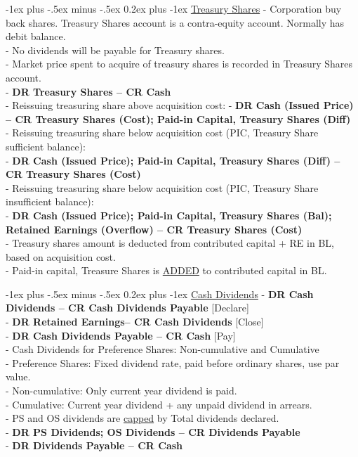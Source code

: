 \documentclass[10pt,landscape]{article}
\makeatletter
\renewcommand{\subsubsection}{\@startsection{subsubsection}{3}{0mm}%
                                {-1ex plus -.5ex minus -.5ex}%
                                {0.2ex plus -1ex}%
                                {\normalfont\footnotesize\bfseries}}
\makeatother
\begin{document}
\begin{multicols}{3}
\begin{scriptsize}
\subsubsection{\underline{Treasury Shares}}
- Corporation buy back shares. Treasury Shares account is a contra-equity account. Normally has debit balance.\\
- No dividends will be payable for Treasury shares.\\
- Market price spent to acquire of treasury shares is recorded in Treasury Shares account.\\
- \textbf{DR Treasury Shares -- CR Cash}\\
- Reissuing treasuring share above acquisition cost:
- \textbf{DR Cash (Issued Price) -- CR Treasury Shares (Cost); Paid-in Capital, Treasury Shares (Diff)}\\
- Reissuing treasuring share below acquisition cost (PIC, Treasury Share sufficient balance):\\
- \textbf{DR Cash (Issued Price); Paid-in Capital, Treasury Shares (Diff) -- CR Treasury Shares (Cost)}\\
- Reissuing treasuring share below acquisition cost (PIC, Treasury Share insufficient balance):\\
- \textbf{DR Cash (Issued Price); Paid-in Capital, Treasury Shares (Bal); Retained Earnings (Overflow) -- CR Treasury Shares (Cost)}\\
- Treasury shares amount is deducted from contributed capital + RE in BL, based on acquisition cost.\\
- Paid-in capital, Treasure Shares is \underline{ADDED} to contributed capital in BL.

\subsubsection{\underline{Cash Dividends}}
- \textbf{DR Cash Dividends -- CR Cash Dividends Payable} [Declare]\\
- \textbf{DR Retained Earnings-- CR Cash Dividends} [Close]\\
- \textbf{DR Cash Dividends Payable -- CR Cash} [Pay]\\
- Cash Dividends for Preference Shares: Non-cumulative and Cumulative\\
- Preference Shares: Fixed dividend rate, paid before ordinary shares, use par value.\\
- Non-cumulative: Only current year dividend is paid.\\
- Cumulative: Current year dividend + any unpaid dividend in arrears.\\
- PS and OS dividends are \underline{capped} by Total dividends declared.\\
- \textbf{DR PS Dividends; OS Dividends -- CR Dividends Payable}\\
- \textbf{DR Dividends Payable -- CR Cash}\\


\end{scriptsize}
\end{multicols}
\end{document}
